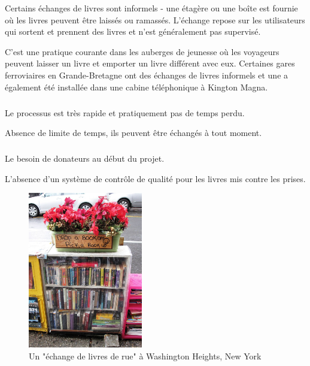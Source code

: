 Certains échanges de livres sont informels - une étagère ou une boîte est fournie où les livres peuvent être laissés ou ramassés. L'échange repose sur les utilisateurs qui sortent et prennent des livres et n'est généralement pas supervisé.\medskip

C'est une pratique courante dans les auberges de jeunesse où les voyageurs peuvent laisser un livre et emporter un livre différent avec eux. Certaines gares ferroviaires en Grande-Bretagne ont des échanges de livres informels et une a également été installée dans une cabine téléphonique à Kington Magna\cite{noauthor_book_2019}.

\subparagraph*{}
\begin{list}{•}{\textbf{Avantages}}
	\item Le processus est très rapide et pratiquement pas de temps perdu.
	\item Absence de limite de temps, ils peuvent être échangés à tout moment.
\end{list}

\subparagraph*{}
\begin{list}{•}{\textbf{Inconvénients}}
	\item Le besoin de donateurs au début du projet.
	\item L'absence d'un système de contrôle de qualité pour les livres mis contre les prises.
\end{list}

\begin{figure}[h]
	\begin{center}
		\includegraphics[width=5cm]{Images/chapter1/bookswapSpot.jpg}
		\caption{{\footnotesize Un "échange de livres de rue" à Washington Heights, New York\cite{noauthor_book_2019}}}
	\end{center}
\end{figure}

\newpage

